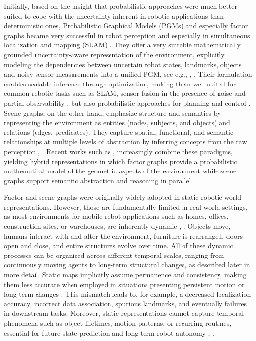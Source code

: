 Initially, based on the insight that probabilistic approaches were much better suited to cope with the uncertainty inherent in robotic applications than deterministic ones, Probabilistic Graphical Models (PGMs) and especially factor graphs became very successful in robot perception and especially in simultaneous localization and mapping (SLAM) \cite{luca_carlone_slam_2025}.  
They offer a very suitable mathematically grounded uncertainty-aware representation of the environment, explicitly modeling the dependencies between uncertain robot states, landmarks, objects and noisy sensor measurements into a unified PGM, see e.g.,  \cite{dellaert_factor_2021}, \cite{dellaert_factor_2017}. Their formulation enables scalable inference through optimization, making them well suited for common robotic tasks such as SLAM, sensor fusion in the presence of noise and partial observability \cite{dellaert_factor_2017}, but also probabilistic approaches for planning and control \cite{mukadam2018continuous}. 
Scene graphs, on the other hand, emphasize structure and semantics by representing the environment as entities (nodes, subjects, and objects) and relations (edges, predicates). They capture spatial, functional, and semantic relationships at multiple levels of abstraction by inferring concepts from the raw perception \cite{chang_comprehensive_2023}, \cite{catalano_3d_2025}.
Recent works such as \cite{hughes_hydra_2022}, \cite{bavle_s-graphs_2025} 
increasingly combine these paradigms, yielding hybrid representations in which factor graphs provide a probabilistic mathematical model of the geometric aspects of the environment while scene graphs support semantic abstraction and reasoning in parallel.

Factor and scene graphs were originally widely adopted in static robotic world representations. However, those are fundamentally limited in real-world settings, as most environments for mobile robot applications such as homes, offices, construction sites, or warehouses, are inherently dynamic \cite{wang_-depth_2025}, \cite{bavle_slam_2023}. 
Objects move, humans interact with and alter the environment, furniture is rearranged, doors open and close, and entire structures evolve over time.
All of these dynamic processes can be organized across different temporal scales, ranging from  continuously moving agents to long-term structural changes, as described later in more detail. 
Static maps implicitly assume permanence and consistency, making them less accurate when employed in situations presenting persistent motion or long-term changes \cite{bescos_dynaslam_2018}. 
This mismatch leads to, for example, a decreased localization accuracy, incorrect data association, spurious landmarks, and eventually  failures in downstream tasks.
Moreover, static representations cannot capture temporal phenomena such as object lifetimes, motion patterns, or recurring routines, essential for future state prediction and long-term robot autonomy \cite{catalano_aion_2025}, \cite{schmid_khronos_2024}.

